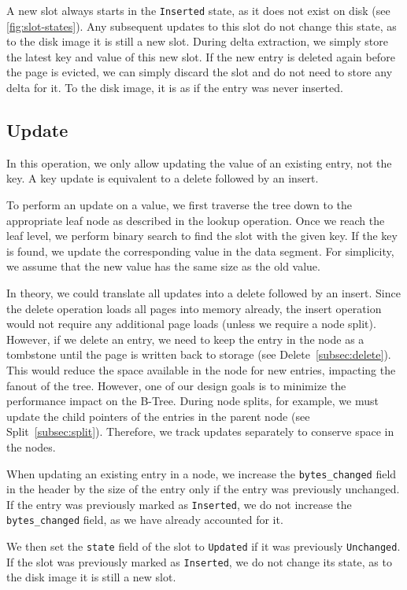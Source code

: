 A new slot always starts in the \texttt{Inserted} state, as it does not exist on disk (see \autoref{fig:slot-states}).
Any subsequent updates to this slot do not change this state, as to the disk image it is still a new slot.
During delta extraction, we simply store the latest key and value of this new slot.
If the new entry is deleted again before the page is evicted, we can simply discard the slot and do not need to store any delta for it.
To the disk image, it is as if the entry was never inserted.

\subsection*{Update}
In this operation, we only allow updating the value of an existing entry, not the key.
A key update is equivalent to a delete followed by an insert.

To perform an update on a value, we first traverse the tree down to the appropriate leaf node as described in the lookup operation.
Once we reach the leaf level, we perform binary search to find the slot with the given key.
If the key is found, we update the corresponding value in the data segment.
For simplicity, we assume that the new value has the same size as the old value.

In theory, we could translate all updates into a delete followed by an insert.
Since the delete operation loads all pages into memory already, the insert operation would not require any additional page loads (unless we require a node split).
However, if we delete an entry, we need to keep the entry in the node as a tombstone until the page is written back to storage (see Delete~\ref{subsec:delete}).
This would reduce the space available in the node for new entries, impacting the fanout of the tree.
However, one of our design goals is to minimize the performance impact on the B-Tree.
During node splits, for example, we must update the child pointers of the entries in the parent node (see Split~\ref{subsec:split}).
Therefore, we track updates separately to conserve space in the nodes.

When updating an existing entry in a node, we increase the \texttt{bytes\_changed} field in the header by the size of the entry only if the entry was previously unchanged.
If the entry was previously marked as \texttt{Inserted}, we do not increase the \texttt{bytes\_changed} field, as we have already accounted for it.

We then set the \texttt{state} field of the slot to \texttt{Updated} if it was previously \texttt{Unchanged}.
If the slot was previously marked as \texttt{Inserted}, we do not change its state, as to the disk image it is still a new slot.

